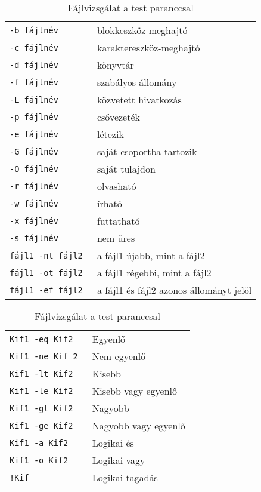 \begin{table}[!h]
\centering
 \begin{tabular}{|ll|}
          \hline
\tt -b fájlnév	& blokkeszköz-meghajtó
\\
\tt -c fájlnév	& karaktereszköz-meghajtó
\\
\tt -d fájlnév	& könyvtár
\\
\tt -f fájlnév	& szabályos állomány
\\
\tt -L fájlnév	& közvetett hivatkozás
\\
\tt -p fájlnév	& csővezeték
\\
\tt -e fájlnév	& létezik
\\
\tt -G fájlnév	& saját csoportba tartozik
\\
\tt -O fájlnév	& saját tulajdon
\\	
\tt -r fájlnév	& olvasható
\\
\tt -w fájlnév	& írható
\\
\tt -x fájlnév	& futtatható
\\
\tt -s fájlnév	& nem üres
\\
\hline
\tt fájl1 -nt fájl2	& a fájl1 újabb, mint a fájl2
\\
\tt fájl1 -ot fájl2	& a fájl1 régebbi, mint a fájl2
\\
\tt fájl1 -ef fájl2	& a fájl1 és fájl2 azonos állományt jelöl
\\
\hline
  \end{tabular}
\caption{Fájlvizsgálat a test paranccsal}
\medskip
\centering
 \begin{tabular}{|ll|}
          \hline
\tt Kif1 -eq Kif2	& Egyenlő
\\
\tt Kif1 -ne Kif 2	& Nem egyenlő
\\
\tt Kif1 -lt Kif2	& Kisebb
\\
\tt Kif1 -le Kif2	& Kisebb vagy egyenlő
\\
\tt Kif1 -gt Kif2	& Nagyobb
\\
\tt Kif1 -ge Kif2	& Nagyobb vagy egyenlő
\\
\hline
\tt Kif1 -a Kif2	& Logikai és
\\
\tt Kif1 -o Kif2	& Logikai vagy
\\
\tt !Kif		& Logikai tagadás
\\

\end{tabular}
\end{table}
